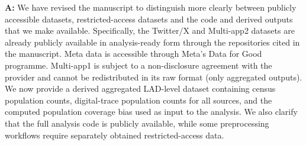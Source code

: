 \documentclass[
  letterpaper,
  DIV=11,
  numbers=noendperiod]{scrartcl}
\begin{document}
\begin{itemize}[noitemsep, topsep=0pt]
{\setlength{\leftskip}{0.5cm}\textbf{A:} We have revised the manuscript to distinguish more clearly between publicly accessible datasets, restricted-access datasets and the code and derived outputs that we make available. Specifically, the Twitter/X and Multi-app2 datasets are already publicly available in analysis-ready form through the repositories cited in the manuscript. Meta data is accessible through Meta’s Data for Good programme. Multi-app1 is subject to a non-disclosure agreement with the provider and cannot be redistributed in its raw format (only aggregated outputs). We now provide a derived aggregated LAD-level dataset containing census population counts, digital-trace population counts for all sources, and the computed population coverage bias used as input to the analysis. We also clarify that the full analysis code is publicly available, while some preprocessing workflows require separately obtained restricted-access data.

}
\end{itemize}
\end{document}
